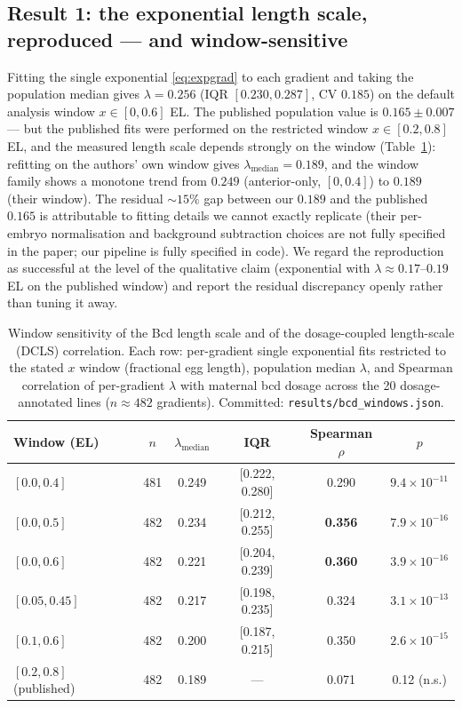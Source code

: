 \subsection{Result 1: the exponential length scale, reproduced --- and
window-sensitive}
\label{sec:lambda}

Fitting the single exponential \eqref{eq:expgrad} to each gradient and taking
the population median gives $\lambda = 0.256$ (IQR $[0.230, 0.287]$, CV
$0.185$) on the default analysis window $x \in [0, 0.6]$ EL. The published
population value is $0.165 \pm 0.007$ \cite{liu2013} --- but the published
fits were performed on the restricted window $x \in [0.2, 0.8]$ EL, and the
measured length scale depends strongly on the window
(Table~\ref{tab:windows}): refitting on the authors' own window gives
$\lambda_{\mathrm{median}} = 0.189$, and the window family shows a monotone
trend from $0.249$ (anterior-only, $[0,0.4]$) to $0.189$ (their window).
The residual $\sim 15\%$ gap between our $0.189$ and the published $0.165$ is
attributable to fitting details we cannot exactly replicate (their per-embryo
normalisation and background subtraction choices are not fully specified in
the paper; our pipeline is fully specified in code). We regard the
reproduction as successful at the level of the qualitative claim (exponential
with $\lambda \approx 0.17$--$0.19$ EL on the published window) and report
the residual discrepancy openly rather than tuning it away.

\begin{table}[!htbp]
\centering
\caption{Window sensitivity of the Bcd length scale and of the
dosage-coupled length-scale (DCLS) correlation. Each row: per-gradient single
exponential fits restricted to the stated $x$ window (fractional egg length),
population median $\lambda$, and Spearman correlation of per-gradient
$\lambda$ with maternal bcd dosage across the 20 dosage-annotated lines
($n \approx 482$ gradients). Committed: \texttt{results/bcd\_windows.json}.}
\label{tab:windows}
\begin{tabular}{lccccc}
\toprule
Window (EL) & $n$ & $\lambda_{\mathrm{median}}$ & IQR & Spearman $\rho$ & $p$ \\
\midrule
$[0.0, 0.4]$ & 481 & 0.249 & [0.222, 0.280] & 0.290 & $9.4\times10^{-11}$ \\
$[0.0, 0.5]$ & 482 & 0.234 & [0.212, 0.255] & \textbf{0.356} & $7.9\times10^{-16}$ \\
$[0.0, 0.6]$ & 482 & 0.221 & [0.204, 0.239] & \textbf{0.360} & $3.9\times10^{-16}$ \\
$[0.05, 0.45]$ & 482 & 0.217 & [0.198, 0.235] & 0.324 & $3.1\times10^{-13}$ \\
$[0.1, 0.6]$ & 482 & 0.200 & [0.187, 0.215] & 0.350 & $2.6\times10^{-15}$ \\
$[0.2, 0.8]$ (published) & 482 & 0.189 & --- & 0.071 & 0.12 (n.s.) \\
\bottomrule
\end{tabular}
\end{table}

